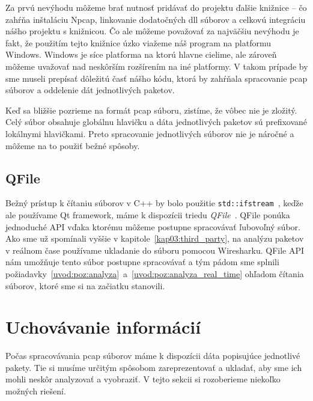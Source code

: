 Za prvú nevýhodu môžeme brať nutnosť pridávať do projektu ďalšie knižnice -- čo zahŕňa inštaláciu Npcap, linkovanie dodatočných dll súborov a celkovú integráciu nášho projektu s knižnicou. Čo ale môžeme považovať za najväčšiu nevýhodu je fakt, že použitím tejto knižnice úzko viažeme náš program na platformu Windows. Windows je síce platforma na ktorú hlavne cielime, ale zároveň môžeme uvažovať nad neskôrším rozšírením na iné platformy. V takom prípade by sme museli prepísať dôležitú časť nášho kódu, ktorá by zahŕňala spracovanie pcap súborov a oddelenie dát jednotlivých paketov.

Keď sa bližšie pozrieme na formát pcap súboru, zistíme, že vôbec nie je zložitý. Celý súbor obsahuje globálnu hlavičku a dáta jednotlivých paketov sú prefixované lokálnymi hlavičkami. Preto spracovanie jednotlivých súborov nie je náročné a môžeme na to použiť bežné spôsoby.

\subsection*{QFile}
Bežný prístup k čítaniu súborov v C++ by bolo použitie \texttt{std::ifstream}~\cite{std_ifstream}, keďže ale používame Qt framework, máme k dispozícii triedu \textit{QFile}~\cite{qfile}. QFile ponúka jednoduché API vďaka ktorému môžeme postupne spracovávať ľubovoľný súbor.
Ako sme už spomínali vyššie v kapitole~\ref{kap03:third_party}, na analýzu paketov v reálnom čase používame ukladanie do súboru pomocou Wiresharku. QFile API nám umožňuje tento súbor postupne spracovávať a tým pádom sme splnili požiadavky~\ref{uvod:poz:analyza}~a~\ref{uvod:poz:analyza_real_time} ohľadom čítania súborov, ktoré sme si na začiatku stanovili.



\section{Uchovávanie informácií}
Počas spracovávania pcap súborov máme k dispozícii dáta popisujúce jednotlivé pakety. Tie si musíme určitým spôsobom zareprezentovať a ukladať, aby sme ich mohli neskôr analyzovať a vyobraziť. V tejto sekcii si rozoberieme niekoľko možných riešení.

